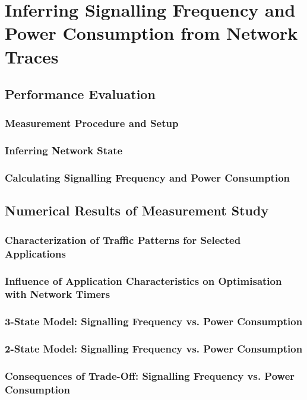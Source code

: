 \section{Inferring Signalling Frequency and Power Consumption from Network Traces}\label{sec:network:network_traces}
\cite{Schwartz2013a}
\subsection{Performance Evaluation}\label{sec:network:network_traces:performance_evaluation}
\subsubsection*{Measurement Procedure and Setup}\label{sec:network:network_traces:performance_evaluation:measurement}
\subsubsection*{Inferring Network State}\label{sec:network:network_traces:performance_evaluation:inferring_network_state}
\subsubsection*{Calculating Signalling Frequency and Power Consumption}\label{sec:network:network_traces:calculating_metrics}

\subsection{Numerical Results of Measurement Study}\label{sec:network:network_traces:numerical_results}
\subsubsection*{Characterization of Traffic Patterns for Selected Applications}\label{sec:network:network_traces:numerical_results:traffic_characterization}
\subsubsection*{Influence of Application Characteristics on Optimisation with Network Timers}\label{sec:network:network_traces:numerical_results:application_influence}
\subsubsection*{3-State Model: Signalling Frequency vs. Power Consumption}\label{sec:network:network_traces:numerical_results:three_states}
\subsubsection*{2-State Model: Signalling Frequency vs. Power Consumption}\label{sec:network:network_traces:numerical_results:two_states}
\subsubsection*{Consequences of Trade-Off: Signalling Frequency vs. Power Consumption}\label{sec:network:network_traces:numerical_results:trade_off}
